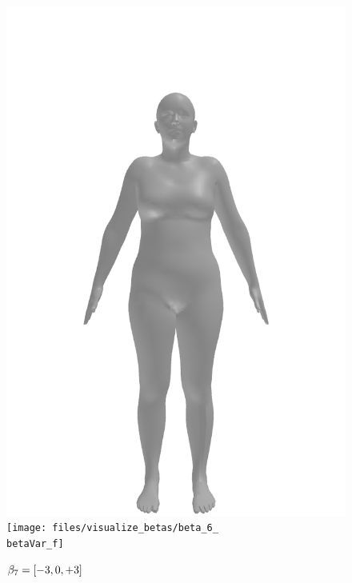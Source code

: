 \begin{figure}[ht!]
\begin{minipage}[b]{\textwidth}
        \includegraphics[width=\imgWidth]{files/visualize_betas/baseline_f}
        \texttt{[image: files/visualize\_betas/beta\_6\_\\betaVar\_f]}
        \caption[Effect of varying $\beta_7$ in SMPL]{$\beta_7 = [-3, 0, +3]$}
    \end{minipage}
\end{figure}

